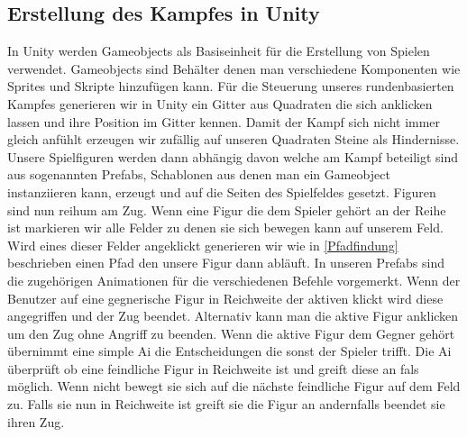 \documentclass[extern,palatino]{cgBA}
\begin{document}
\subsection{Erstellung des Kampfes in Unity}
In Unity werden Gameobjects als Basiseinheit für die Erstellung von Spielen verwendet. Gameobjects sind Behälter denen man verschiedene Komponenten wie Sprites und Skripte hinzufügen kann. Für die Steuerung unseres rundenbasierten Kampfes generieren wir in Unity ein Gitter aus Quadraten die sich anklicken lassen und ihre Position im Gitter kennen. Damit der Kampf sich nicht immer gleich anfühlt erzeugen wir zufällig auf unseren Quadraten Steine als Hindernisse. Unsere Spielfiguren werden dann abhängig davon welche am Kampf beteiligt sind aus sogenannten Prefabs, Schablonen aus denen man ein Gameobject instanziieren kann, erzeugt und auf die Seiten des Spielfeldes gesetzt. Figuren sind nun reihum am Zug. Wenn eine Figur die dem Spieler gehört an der Reihe ist markieren wir alle Felder zu denen sie sich bewegen kann auf unserem Feld. Wird eines dieser Felder angeklickt generieren wir wie in \ref{Pfadfindung} beschrieben einen Pfad den unsere Figur dann abläuft. In unseren Prefabs sind die zugehörigen Animationen für die verschiedenen Befehle vorgemerkt. Wenn der Benutzer auf eine gegnerische Figur in Reichweite der aktiven klickt wird diese angegriffen und der Zug beendet. Alternativ kann man die aktive Figur anklicken um den Zug ohne Angriff zu beenden. Wenn die aktive Figur dem Gegner gehört übernimmt eine simple Ai die Entscheidungen die sonst der Spieler trifft. Die Ai überprüft ob eine feindliche Figur in Reichweite ist und greift diese an fals möglich. Wenn nicht bewegt sie sich auf die nächste feindliche Figur auf dem Feld zu. Falls sie nun in Reichweite ist greift sie die Figur an andernfalls beendet sie ihren Zug.
\end{document}

